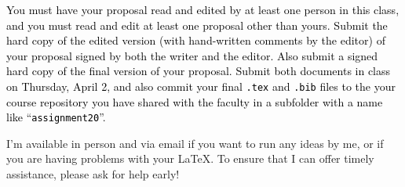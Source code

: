 \textcolor{black}{You must have your proposal read and edited by at least one person in this class, and you must read
  and edit at least one proposal other than yours.  Submit the hard copy of the edited version (with hand-written
  comments by the editor) of your proposal signed by both the writer and the editor.  Also submit a signed hard copy of
  the final version of your proposal.  Submit both documents in class on Thursday, April 2, and also commit your final
{\tt .tex} and {\tt .bib} files to the your course repository you have shared with the faculty in a subfolder with a
name like ``{\tt assignment20}''.}

I'm available in person and via email if you want to run any ideas by me, or if you are having problems with your
\LaTeX. To ensure that I can offer timely assistance, please ask for help early!


